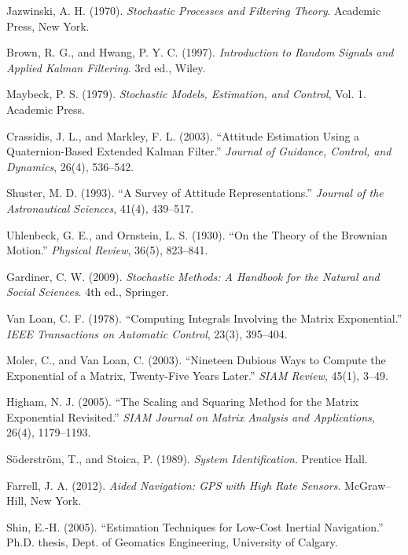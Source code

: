 \documentclass[10pt]{extarticle}
\begin{document}
\begin{thebibliography}{99}

Jazwinski, A. H. (1970).  
\emph{Stochastic Processes and Filtering Theory}.  
Academic Press, New York.

Brown, R. G., and Hwang, P. Y. C. (1997).  
\emph{Introduction to Random Signals and Applied Kalman Filtering}.  
3rd ed., Wiley.

Maybeck, P. S. (1979).  
\emph{Stochastic Models, Estimation, and Control}, Vol. 1.  
Academic Press.

Crassidis, J. L., and Markley, F. L. (2003).  
“Attitude Estimation Using a Quaternion-Based Extended Kalman Filter.”  
\emph{Journal of Guidance, Control, and Dynamics}, 26(4), 536–542.

Shuster, M. D. (1993).  
“A Survey of Attitude Representations.”  
\emph{Journal of the Astronautical Sciences}, 41(4), 439–517.

Uhlenbeck, G. E., and Ornstein, L. S. (1930).  
“On the Theory of the Brownian Motion.”  
\emph{Physical Review}, 36(5), 823–841.

Gardiner, C. W. (2009).  
\emph{Stochastic Methods: A Handbook for the Natural and Social Sciences}.  
4th ed., Springer.

Van Loan, C. F. (1978).  
“Computing Integrals Involving the Matrix Exponential.”  
\emph{IEEE Transactions on Automatic Control}, 23(3), 395–404.

Moler, C., and Van Loan, C. (2003).  
“Nineteen Dubious Ways to Compute the Exponential of a Matrix, Twenty-Five Years Later.”  
\emph{SIAM Review}, 45(1), 3–49.

Higham, N. J. (2005).  
“The Scaling and Squaring Method for the Matrix Exponential Revisited.”  
\emph{SIAM Journal on Matrix Analysis and Applications}, 26(4), 1179–1193.

S{\"o}derstr{\"o}m, T., and Stoica, P. (1989).  
\emph{System Identification}.  
Prentice Hall.

Farrell, J. A. (2012).  
\emph{Aided Navigation: GPS with High Rate Sensors}.  
McGraw–Hill, New York.

Shin, E.-H. (2005).  
“Estimation Techniques for Low-Cost Inertial Navigation.”  
Ph.D. thesis, Dept. of Geomatics Engineering, University of Calgary.


\end{thebibliography}
\end{document}
